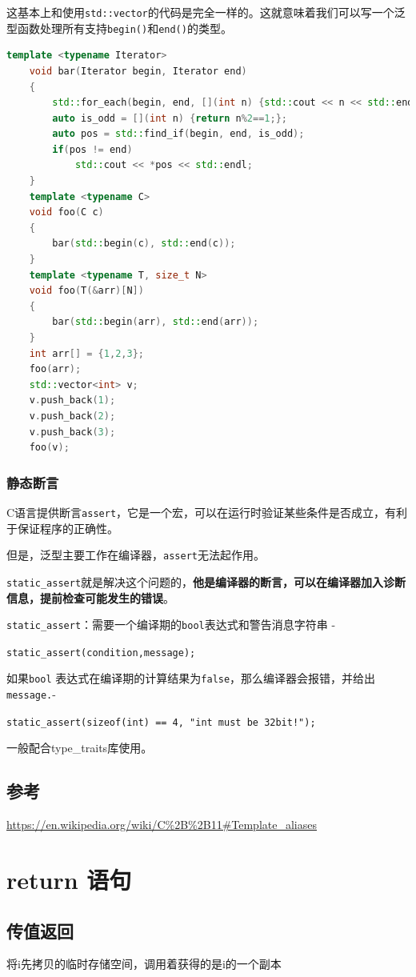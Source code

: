 \documentclass[UTF8,a4paper,12pt]{ctexbook} %
\begin{document}
				这基本上和使用\verb|std::vector|的代码是完全一样的。这就意味着我们可以写一个泛型函数处理所有支持\verb|begin()|和\verb|end()|的类型。
				
				\begin{lstlisting}[language=C++]
	template <typename Iterator>
	void bar(Iterator begin, Iterator end)
	{
		std::for_each(begin, end, [](int n) {std::cout << n << std::endl;});
		auto is_odd = [](int n) {return n%2==1;};
		auto pos = std::find_if(begin, end, is_odd);
		if(pos != end)
			std::cout << *pos << std::endl;
	}
	template <typename C>
	void foo(C c)
	{
		bar(std::begin(c), std::end(c));
	}
	template <typename T, size_t N>
	void foo(T(&arr)[N])
	{
		bar(std::begin(arr), std::end(arr));
	}
	int arr[] = {1,2,3};
	foo(arr);
	std::vector<int> v;
	v.push_back(1);
	v.push_back(2);
	v.push_back(3);
	foo(v);				
				\end{lstlisting}
		\subsection{静态断言}
			C语言提供断言\verb|assert|，它是一个宏，可以在运行时验证某些条件是否成立，有利于保证程序的正确性。
			
			但是，泛型主要工作在编译器，\verb|assert|无法起作用。
			
			\verb|static_assert|就是解决这个问题的，\textbf{他是编译器的断言，可以在编译器加入诊断信息，提前检查可能发生的错误}。
			
			\verb|static_assert|：需要一个编译期的\verb|bool|表达式和警告消息字符串 - 
			
			\verb|static_assert(condition,message);|
			
			如果\verb|bool| 表达式在编译期的计算结果为\verb|false|，那么编译器会报错，并给出\verb|message.|-
			
			\verb|static_assert(sizeof(int) == 4, "int must be 32bit!");|
			
			一般配合type\_traits库使用。
	\section{参考}
		\url{https://en.wikipedia.org/wiki/C\%2B\%2B11\#Template_aliases}
			
\chapter{return 语句}           
 
 	\section{传值返回}将i先拷贝的临时存储空间，调用着获得的是i的一个副本
 		 
\end{document}
